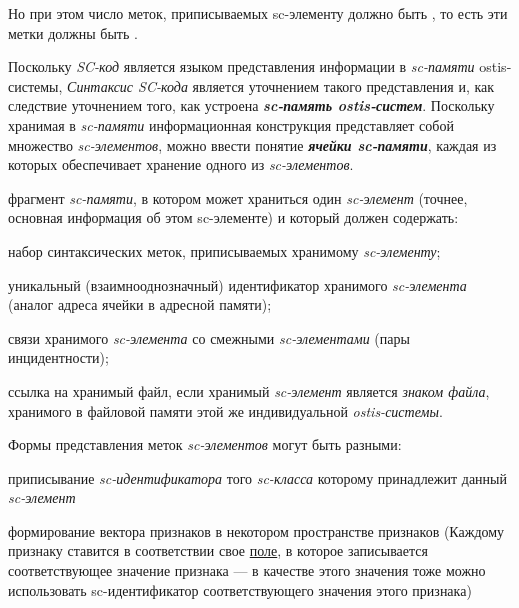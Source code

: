 Но при этом число меток, приписываемых sc-элементу должно быть , то есть эти метки должны быть .

Поскольку \textit{SC-код} является языком  представления информации в \textit{sc-памяти} ostis-системы, \textit{Синтаксис SC-кода} является уточнением  такого представления и, как следствие уточнением того, как устроена \textbf{\textit{sc-память ostis-систем}}. Поскольку хранимая в \textit{sc-памяти} информационная конструкция представляет собой множество \textit{sc-элементов}, можно ввести понятие \textbf{\textit{ячейки sc-памяти}}, каждая из которых обеспечивает хранение одного из \textit{sc-элементов}.

\begin{SCn}
	{фрагмент \textit{sc-памяти}, в котором может храниться один \textit{sc-элемент} (точнее, основная информация об этом sc-элементе) и который должен содержать:
		\begin{textitemize}
			\item набор синтаксических меток, приписываемых хранимому \textit{sc-элементу};
			\item уникальный (взаимнооднозначный) идентификатор хранимого \textit{sc-элемента} (аналог адреса ячейки в адресной памяти);
			\item связи хранимого \textit{sc-элемента} со смежными \textit{sc-элементами} (пары инцидентности);
			\item ссылка на хранимый файл, если хранимый \textit{sc-элемент} является \textit{знаком файла}, хранимого в файловой памяти этой же индивидуальной \textit{ostis-системы}.
		\end{textitemize}
	}
\end{SCn}

Формы представления меток \textit{sc-элементов} могут быть разными:
\begin{textitemize}
	\item приписывание \textit{sc-идентификатора} того \textit{sc-класса} которому принадлежит данный \textit{sc-элемент}
	\item формирование вектора признаков в некотором пространстве признаков (Каждому признаку ставится в соответствии свое \uline{поле}, в которое записывается соответствующее значение признака --- в качестве этого значения тоже можно использовать sc-идентификатор соответствующего значения этого признака)
\end{textitemize}

